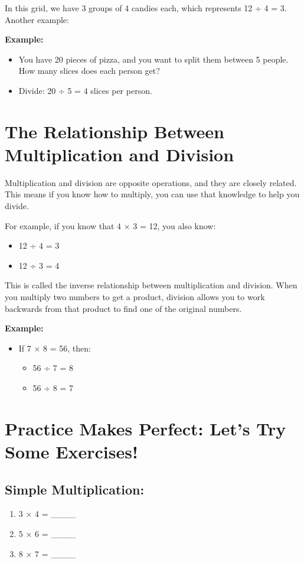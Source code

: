 In this grid, we have 3 groups of 4 candies each, which represents 12 ÷ 4 = 3.
Another example:

\textbf{Example:}
\begin{itemize}
    \item You have 20 pieces of pizza, and you want to split them between 5 people. How many slices does each person get?
    \item Divide: 20 ÷ 5 = 4 slices per person.
\end{itemize}

\section{The Relationship Between Multiplication and Division}
Multiplication and division are opposite operations, and they are closely related. This means if you know how to multiply, you can use that knowledge to help you divide.

For example, if you know that 4 × 3 = 12, you also know:
\begin{itemize}
    \item 12 ÷ 4 = 3
    \item 12 ÷ 3 = 4
\end{itemize}

This is called the inverse relationship between multiplication and division. When you multiply two numbers to get a product, division allows you to work backwards from that product to find one of the original numbers.

\textbf{Example:}
\begin{itemize}
    \item If 7 × 8 = 56, then:
    \begin{itemize}
        \item 56 ÷ 7 = 8
        \item 56 ÷ 8 = 7
    \end{itemize}
\end{itemize}

\section{Practice Makes Perfect: Let’s Try Some Exercises!}
\subsection{Simple Multiplication:}
\begin{enumerate}
    \item 3 × 4 = \_\_\_\_
    \item 5 × 6 = \_\_\_\_
    \item 8 × 7 = \_\_\_\_
\end{enumerate}

